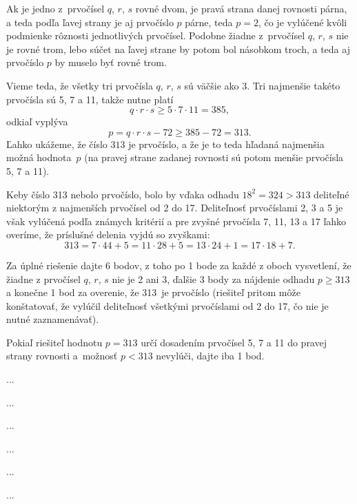 {%
Ak je jedno z~prvočísel $q$, $r$, $s$ rovné dvom,
je pravá strana danej rovnosti párna, a teda podľa ľavej strany je
aj prvočíslo $p$ párne, teda $p=2$,
čo je vylúčené kvôli podmienke rôznosti jednotlivých prvočísel.
Podobne žiadne z~prvočísel $q$, $r$, $s$ nie je rovné trom,
lebo súčet na ľavej strane by potom bol násobkom troch,
a teda aj prvočíslo $p$ by muselo byť rovné trom.

Vieme teda, že všetky tri prvočísla $q$, $r$, $s$ sú väčšie ako
3. Tri najmenšie takéto prvočísla sú 5, 7 a 11, takže nutne platí
$$
q\cdot r\cdot s\geq 5\cdot 7\cdot 11=385,
$$
odkiaľ vyplýva
$$
p=q\cdot r\cdot s-72\ge 385-72=313.
$$
Ľahko ukážeme, že číslo $313$ je prvočíslo,
a že je to teda hľadaná najmenšia možná hodnota~$p$ (na pravej
strane zadanej rovnosti sú potom menšie prvočísla 5, 7 a 11).

Keby číslo 313 nebolo prvočíslo, bolo by vďaka odhadu $18^2=324>313$
deliteľné niektorým z najmenších prvočísel od 2 do 17.
Deliteľnosť prvočíslami 2, 3 a 5 je však vylúčená podľa známych kritérií
a pre zvyšné prvočísla 7, 11, 13 a 17 ľahko overíme, že
príslušné delenia
vyjdú so zvyškami:
$$
313=7\cdot44+5=
11\cdot28+5=13\cdot24+1=17\cdot18+7.
$$

\schemaABC
Za úplné riešenie dajte 6 bodov, z toho po 1 bode za každé z
oboch vysvetlení, že žiadne z prvočísel $q$, $r$, $s$ nie je 2 ani 3,
ďalšie 3 body za nájdenie odhadu $p\geq 313$ a konečne 1 bod za
overenie, že 313~je prvočíslo (riešiteľ pritom môže konštatovať, že vylúčil deliteľnosť
všetkými prvočíslami od 2 do 17, čo nie je nutné zaznamenávať).

Pokiaľ riešiteľ hodnotu $p=313$ určí dosadením prvočísel
5, 7 a 11 do pravej strany rovnosti a~možnosť $p<313$ nevylúči,
dajte iba 1 bod.
\endschema
}

{%
...}

{%
...}

{%
...}

{%
...}

{%
...}

{%
...}

